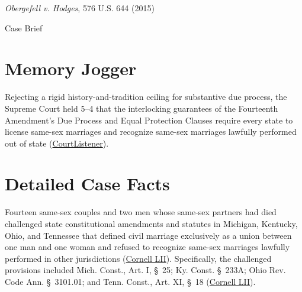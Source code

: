 \documentclass[12pt]{article}
\begin{document}
\begin{center}
{\LARGE \textit{Obergefell v. Hodges}, 576 U.S. 644 (2015)\par}
\vspace{0.8em}
{\large Case Brief\par}
\end{center}
\vspace{1em}

\section{Memory Jogger}

Rejecting a rigid history-and-tradition ceiling for substantive due process, the Supreme Court held 5--4 that the interlocking guarantees of the Fourteenth Amendment's Due Process and Equal Protection Clauses require every state to license same-sex marriages and recognize same-sex marriages lawfully performed out of state (\href{https://www.courtlistener.com/opinion/2812209/obergefell-v-hodges/}{CourtListener}).

\section{Detailed Case Facts}

Fourteen same-sex couples and two men whose same-sex partners had died challenged state constitutional amendments and statutes in Michigan, Kentucky, Ohio, and Tennessee that defined civil marriage exclusively as a union between one man and one woman and refused to recognize same-sex marriages lawfully performed in other jurisdictions (\href{https://www.law.cornell.edu/supremecourt/text/14-556}{Cornell LII}). Specifically, the challenged provisions included Mich. Const., Art. I, \S~25; Ky. Const. \S~233A; Ohio Rev. Code Ann. \S~3101.01; and Tenn. Const., Art. XI, \S~18 (\href{https://www.law.cornell.edu/supremecourt/text/14-556}{Cornell LII}).
\end{document}
